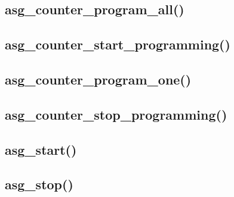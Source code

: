 \subsection{asg\_counter\_program\_all()}
\subsection{asg\_counter\_start\_programming()}
\subsection{asg\_counter\_program\_one()}
\subsection{asg\_counter\_stop\_programming()}

\subsection{asg\_start()}
\subsection{asg\_stop()}

